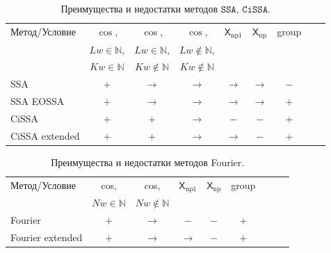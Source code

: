 \documentclass[12pt, specialist, subf
]{disser}
\theoremstyle{definition}
\newcommand{\SSA}{\texttt{SSA}}
\newcommand{\CISSA}{\texttt{CiSSA}}
\newcommand{\TS}{\mathsf{X}}
\begin{document}
\begin{table}[H]
	\caption{Преимущества и недостатки методов $\SSA$, $\CISSA$.}
	\centering
	\begin{center}
		\begin{tabular}{l|cccccccc}
			\hline
			Метод/Условие  & $\cos$,             & $\cos$,                & $\cos$,                 & $\TS_{\mathrm{np1}}$ & $\TS_{\mathrm{np}}$ & group \\
			               & $Lw \in \mathbb N$, & $Lw\in \mathbb N$,     & $Lw \not\in \mathbb N$, &                                                    \\
			               & $Kw\in \mathbb N$   & $Kw \not\in \mathbb N$ & $Kw \not\in \mathbb N$  &                                                    \\
			\hline
			SSA            & $+$                 & $\to$                  & $\to$                   & $\to$                & $\to$               & $-$   \\
			SSA EOSSA      & $+$                 & $\to$                  & $\to$                   & $\to$                & $\to$               & $+$   \\
			CiSSA          & $+$                 & $+$                    & $\to$                   & $-$                  & $-$                 & $+$   \\
			CiSSA extended & $+$                 & $+$                    & $\to$                   & $\to$                & $-$                 & $+$   \\
			\hline
		\end{tabular}
	\end{center}
	\label{tab:advantages_ssa_cissa}
\end{table}

\begin{table}[H]
	\caption{Преимущества и недостатки методов Fourier.}
	\centering
	\begin{center}
		\begin{tabular}{l|cccccccc}
			\hline
			Метод/Условие    & cos,               & cos,                    & $\TS_{\mathrm{np1}}$ & $\TS_{\mathrm{np}}$ & group \\
			                 & $Nw \in \mathbb N$ & $Nw \not \in \mathbb N$                                                      \\
			\hline
			Fourier          & $+$                & $\to$                   & $-$                  & $-$                 & $+$   \\
			Fourier extended & $+$                & $\to$                   & $\to$                & $-$                 & $+$   \\
			\hline
		\end{tabular}
	\end{center}
	\label{tab:advantages_fourier}
\end{table}
\end{document}

